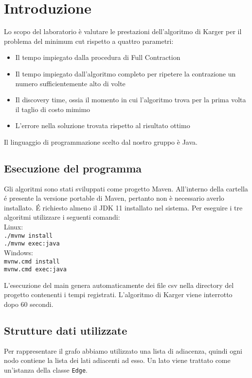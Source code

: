 \section{Introduzione}
Lo scopo del laboratorio è valutare le prestazioni dell'algoritmo di Karger per il problema del minimum cut rispetto a quattro parametri:
\begin{itemize}
\item Il tempo impiegato dalla procedura di Full Contraction
\item Il tempo impiegato dall'algoritmo completo per ripetere la contrazione un numero sufficientemente alto di volte
\item Il discovery time, ossia il momento in cui l'algoritmo trova per la prima volta il taglio di costo mimimo
\item L'errore nella soluzione trovata rispetto al risultato ottimo
\end{itemize}
Il linguaggio di programmazione scelto dal nostro gruppo è Java.

\subsection{Esecuzione del programma}
Gli algoritmi sono stati sviluppati come progetto Maven. All'interno della cartella \'e presente la versione portable di Maven, pertanto non è necessario averlo installato. \'E
richiesto almeno il JDK 11 installato nel sistema.
Per eseguire i tre algoritmi utilizzare i seguenti comandi:\\
Linux:\\
\indent \texttt{./mvnw install}\\
\indent \texttt{./mvnw exec:java}\\
Windows:\\
\indent \texttt{mvnw.cmd install}\\
\indent \texttt{mvnw.cmd exec:java}

L'esecuzione del main genera automaticamente dei file csv nella directory del progetto contenenti i tempi registrati. 
L'algoritmo di Karger viene interrotto dopo 60 secondi.
\subsection{Strutture dati utilizzate}

Per rappresentare il grafo abbiamo utilizzato una lista di adiacenza, quindi ogni nodo contiene la lista dei lati adiacenti ad esso.
Un lato viene trattato come un'istanza della classe \texttt{Edge}.

